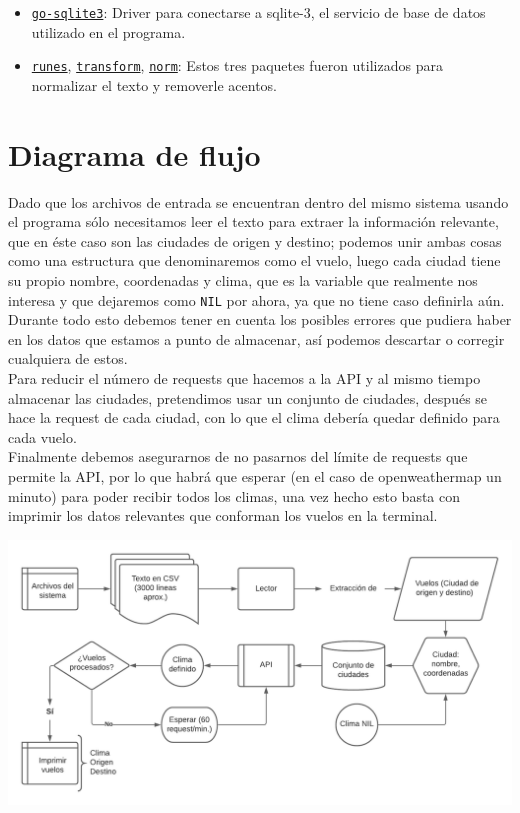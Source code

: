 \documentclass{report}
\begin{document}
\begin{itemize}
    \begin{itemize}
        \item \href{https://github.com/mattn/go-sqlite3/}{\texttt{go-sqlite3}}: Driver para conectarse a sqlite-3, el servicio de base de datos utilizado en el programa.
        \item \href{https://golang.org/x/text/runes/}{\texttt{runes}}, \href{https://golang.org/x/text/transform/}{\texttt{transform}},
        \href{https://golang.org/x/text/unicode/norm/}{\texttt{norm}}: Estos tres paquetes fueron utilizados para normalizar el texto y removerle acentos.
    \end{itemize}
\end{itemize}

\section*{Diagrama de flujo}
Dado que los archivos de entrada se encuentran dentro del mismo sistema usando el programa sólo necesitamos leer el texto para extraer la información relevante, que en éste caso son las ciudades de origen y destino; podemos unir ambas cosas como una estructura que denominaremos como el vuelo, luego cada ciudad tiene su propio nombre, coordenadas y clima, que es la variable que realmente nos interesa y que dejaremos como \texttt{NIL} por ahora, ya que no tiene caso definirla aún. Durante todo esto debemos tener en cuenta los posibles errores que pudiera haber en los datos que estamos a punto de almacenar, así podemos descartar o corregir cualquiera de estos.\\Para reducir el número de requests que hacemos a la API y al mismo tiempo almacenar las ciudades, pretendimos usar un conjunto de ciudades, después se hace la request de cada ciudad, con lo que el clima debería quedar definido para cada vuelo. \\Finalmente debemos asegurarnos de no pasarnos del límite de requests que permite la API, por lo que habrá que esperar (en el caso de openweathermap un minuto) para poder recibir todos los climas, una vez hecho esto basta con imprimir los datos relevantes que conforman los vuelos en la terminal.

\begin{center}
    \includegraphics[width=17cm]{images/flow.png}
\end{center}
\end{document}
